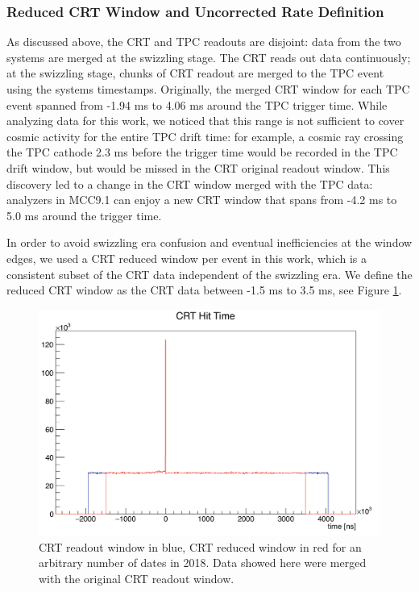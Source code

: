 \subsubsection{Reduced CRT Window and  Uncorrected Rate Definition}\label{sec:RateDef}
As discussed above, the CRT and TPC readouts are disjoint: data from the two systems are merged at the swizzling stage.  
The CRT reads out data continuously; at the swizzling stage, chunks of CRT readout are merged to the TPC event using the systems timestamps.
Originally, the merged CRT window for each TPC event spanned from -1.94 ms to 4.06 ms around the TPC trigger time. While analyzing data for this work, we noticed that this range is not sufficient to cover cosmic activity for the entire TPC drift time: for example, a cosmic ray crossing the TPC cathode 2.3 ms before the trigger time would be recorded in the TPC drift window, but would be missed in the CRT original readout window. This discovery led to a change in the CRT window merged with the TPC data: analyzers in MCC9.1 can enjoy a new CRT window that spans from -4.2 ms to 5.0 ms around the trigger time.

In order to avoid swizzling era confusion and  eventual inefficiencies at the window edges,  we used a CRT reduced window per event in this work, which is a consistent subset of the CRT data independent of the swizzling era. We define the reduced CRT window as the CRT data between -1.5 ms to 3.5 ms, see Figure \ref{fig:ReadOutWindow}. 


\begin{figure}[h!]
\centering
\includegraphics[scale=0.4]{images/window.png}
\caption{CRT readout window in blue, CRT reduced window in red for an arbitrary number of dates in 2018. Data showed here were merged with the original CRT readout window.}
\label{fig:ReadOutWindow}
\end{figure}


